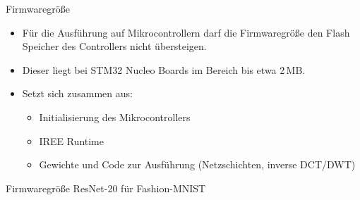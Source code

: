 \documentclass[aspectratio=169, 12pt]{beamer}
\begin{document}
\begin{frame}{Firmwaregröße}
  \begin{itemize}
    \item Für die Ausführung auf Mikrocontrollern darf die Firmwaregröße den Flash Speicher des Controllers nicht übersteigen.
    \item Dieser liegt bei STM32 Nucleo Boards im Bereich bis etwa 2$\,$MB.
    \item Setzt sich zusammen aus:
    \begin{itemize}
      \item Initialisierung des Mikrocontrollers
      \item IREE Runtime
      \item Gewichte und Code zur Ausführung (Netzschichten, inverse DCT/DWT)
    \end{itemize}
  \end{itemize}
\end{frame}

\begin{frame}{Firmwaregröße ResNet-20 für Fashion-MNIST}
  \begin{figure}
\end{figure}
\end{frame}
\end{document}
